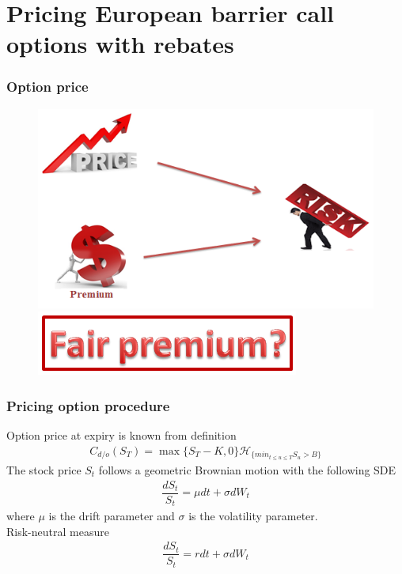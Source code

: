 \documentclass{beamer}
\begin{document}
\section{Pricing European barrier call options with rebates}
\begin{frame}
\frametitle{Option price}
\begin{figure}[htp]
	\begin{center}
		\includegraphics[scale=0.6]{fig9}
	\end{center} \pause 
\begin{center}
	\includegraphics[scale=0.6]{fig10}
\end{center}
\end{figure}	
\end{frame}
\begin{frame}
\frametitle{Pricing option procedure}
Option price at expiry is known from definition
\begin{align}
	C_{d/o}(S_T)=\max\{S_T-K, 0\}\mathcal{H}_{\{min_{t\leq u\leq T}S_u > B\}}
\end{align}
The stock price $S_t$ follows a geometric Brownian motion with the following SDE
\begin{align*}
\dfrac{dS_t}{S_t}=\mu dt+\sigma dW_t
\end{align*}
where $\mu$ is the drift parameter and $\sigma$ is the volatility parameter.\\[0.5cm]
Risk-neutral measure
\begin{align*}
	\dfrac{dS_t}{S_t}=r dt+\sigma dW_t
\end{align*}
\end{frame}
\end{document}
